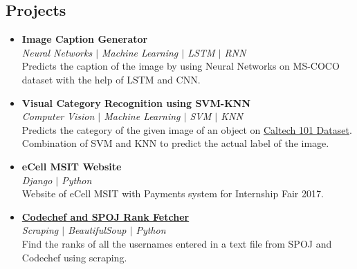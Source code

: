 \documentclass[margin, centered]{res}
\begin{document}
\begin{resume}
\section{Projects}
\begin{itemize}[leftmargin=*]
 \item \textbf{Image Caption Generator}\\
 \emph{\color{BlueViolet}Neural Networks $\vert$ Machine Learning $\vert$ LSTM $\vert$ RNN} \\
 Predicts the caption of the image by using Neural Networks on MS-COCO dataset with the help of LSTM and CNN.
 \item \textbf{Visual Category Recognition using SVM-KNN}\\
 \emph{\color{BlueViolet}Computer Vision $\vert$ Machine Learning $\vert$ SVM $\vert$ KNN} \\
 Predicts the category of the given image of an object on \href {https://www.vision.caltech.edu/Image_Datasets/Caltech101/}{Caltech 101 Dataset}. Combination of SVM and KNN to predict the actual label of the image.
 \item \textbf{eCell MSIT Website} \\
 \emph{\color{BlueViolet} Django $\vert$ Python} \\
 Website of eCell MSIT with Payments system for Internship Fair 2017.
 \item \textbf{\href{https://github.com/nickzuck}{Codechef and SPOJ Rank Fetcher}}\\
 \emph{\color{BlueViolet}Scraping $\vert$ BeautifulSoup $\vert$ Python} \\
 Find the ranks of all the usernames entered in a text file from SPOJ and Codechef using scraping.
\end{itemize}



\end{resume}
\end{document}
